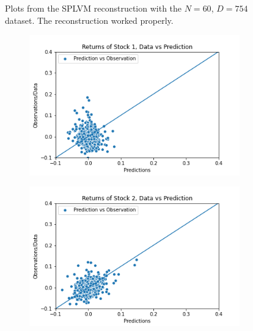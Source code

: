 \begin{figure}
\begin{subfigure}[r]{0.3\textwidth}
	\end{subfigure}
	\caption[Y-$\hat{Y}$ pair plots for N=60 with the SPLVM model]{Plots from the SPLVM reconstruction with the $N=60$, $D=754$ dataset. The reconstruction worked properly. }
	\label{fig:studt_N60_pairs}
\end{figure}
\begin{figure}%
	\centering
	\begin{subfigure}[l]{0.3\textwidth}
		\includegraphics[width=\textwidth]{img/07_1/N100/Q1_kernel1_stock1_scatter.png}
	\end{subfigure}
	\begin{subfigure}[c]{0.3\textwidth}
		\includegraphics[width=\textwidth]{img/07_1/N100/Q1_kernel1_stock2_scatter.png}
	\end{subfigure}
	\begin{subfigure}[r]{0.3\textwidth}

\end{subfigure}
\end{figure}

